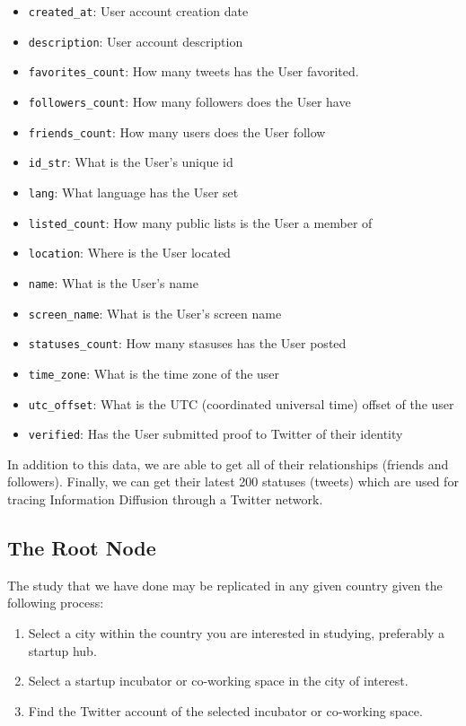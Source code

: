 \begin{itemize}
\item \verb|created_at|: User account creation date
\item \verb|description|: User account description
\item \verb|favorites_count|: How many tweets has the User favorited.
\item \verb|followers_count|: How many followers does the User have
\item \verb|friends_count|: How many users does the User follow
\item \verb|id_str|: What is the User's unique id
\item \verb|lang|: What language has the User set
\item \verb|listed_count|: How many public lists is the User a member of
\item \verb|location|: Where is the User located
\item \verb|name|: What is the User's name
\item \verb|screen_name|: What is the User's screen name
\item \verb|statuses_count|: How many stasuses has the User posted
\item \verb|time_zone|: What is the time zone of the user
\item \verb|utc_offset|: What is the UTC (coordinated universal time) offset of the user
\item \verb|verified|: Has the User submitted proof to Twitter of their identity
\end{itemize}

In addition to this data, we are able to get all of their relationships (friends and followers). Finally, we can get their latest 200 statuses (tweets) which are used for tracing Information Diffusion through a Twitter network.

\subsection{The Root Node}
The study that we have done may be replicated in any given country given the following process:

\begin{enumerate}
\item Select a city within the country you are interested in studying, preferably a startup hub.
\item Select a startup incubator or co-working space in the city of interest.
\item Find the Twitter account of the selected incubator or co-working space.
\end{enumerate}

